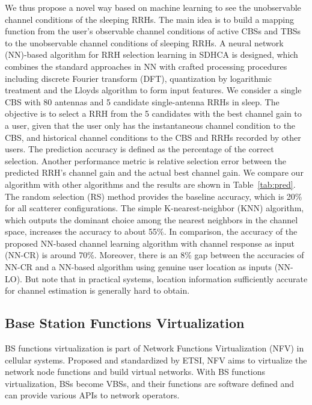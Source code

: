 \documentclass[12pt, draftclsnofoot,onecolumn]{IEEEtran}
\begin{document}
We thus propose a novel way based on machine learning to see the unobservable
channel conditions of the sleeping RRHs. The main idea is to build a mapping
function from the user's observable channel conditions of active CBSs and TBSs
to the unobservable channel conditions of sleeping RRHs.
A neural network (NN)-based algorithm for RRH selection
learning in SDHCA is designed, which combines the standard
approaches in NN with crafted processing procedures including discrete Fourier
transform (DFT), quantization by
logarithmic treatment and the Lloyds algorithm to form input features. We consider a single CBS with 80
antennas and 5 candidate single-antenna RRHs in sleep. The objective is to
select a RRH from the 5 candidates with the best channel gain to a user, given that the
user only has the instantaneous channel condition to the CBS, and historical
channel conditions to the CBS and RRHs recorded by other users. The prediction
accuracy is defined as the percentage of the correct selection. Another
performance metric is relative selection error between the predicted RRH's
channel gain and the actual best channel gain. We compare our algorithm with
other algorithms and the results are shown in Table~\ref{tab:pred}. The random selection (RS)
method provides the baseline accuracy, which is 20\% for all scatterer
configurations. The simple K-nearest-neighbor (KNN) algorithm, which outputs
the dominant choice among the  nearest neighbors in the channel space,
increases the accuracy to about 55\%. In comparison, the accuracy of the
proposed NN-based channel learning algorithm with channel response as input (NN-CR) is around 70\%. Moreover, there is an 8\% gap
between the accuracies of NN-CR and a NN-based algorithm using
genuine user location as inputs (NN-LO). But note that in practical systems,
location information sufficiently accurate for channel estimation is generally hard to
obtain.

\subsection{Base Station Functions Virtualization}

BS functions virtualization is part of Network Functions
Virtualization (NFV) in cellular systems. Proposed and standardized by ETSI,
NFV aims to virtualize the network node
functions and build virtual networks. With BS functions virtualization, BSs
become VBSs, and their functions are software defined and can provide various APIs to
network operators.
\end{document}

